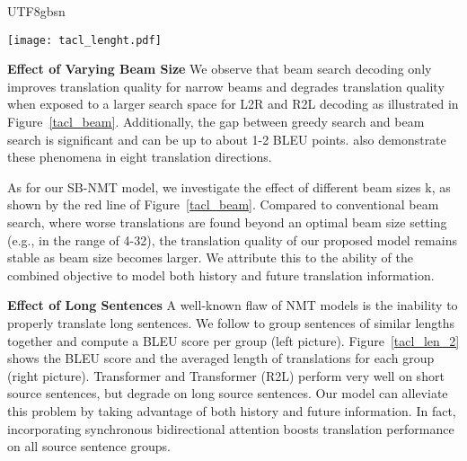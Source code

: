 \documentclass[11pt,a4paper]{article}
\begin{document}
\begin{CJK*}{UTF8}{gbsn}
\begin{figure*}
	\setlength{\abovecaptionskip}{0cm}
	\setlength{\belowcaptionskip}{-0.1cm}
	\centering
	\texttt{[image: tacl\_lenght.pdf]}
	\caption{Performance of translations on the test set with respect to the lengths of the source sentences.
	}\label{tacl_len_2}
\end{figure*}

\textbf{Effect of Varying Beam Size}
We observe that beam search decoding only improves translation quality for narrow beams and degrades translation quality when exposed to a larger search space for L2R and R2L decoding as illustrated in Figure~\ref{tacl_beam}. 
Additionally, the gap between greedy search and beam search is significant and can be up to about 1-2 BLEU points.
 also demonstrate these phenomena in eight translation directions.

As for our SB-NMT model, we investigate the effect of different beam sizes k, as shown by the red line of Figure~\ref{tacl_beam}. 
Compared to conventional beam search, where worse translations are found beyond an optimal beam size setting (e.g., in the range of 4-32), the translation quality of our proposed model remains stable as beam size becomes larger.
We attribute this to the ability of the combined objective to model both history and future translation information. 




\textbf{Effect of Long Sentences}
A well-known flaw of NMT models is the inability to properly translate long sentences.
We follow  to group sentences of similar lengths together and compute a BLEU score per group (left picture). Figure~\ref{tacl_len_2} shows the BLEU score and the averaged length of translations for each group (right picture).
Transformer and Transformer (R2L) perform very well on short source sentences, but degrade on long source sentences. 
Our model can alleviate this problem by taking advantage of both history and future information.
In fact, incorporating synchronous bidirectional attention boosts translation performance on all source sentence groups.


\end{CJK*}
\end{document}
